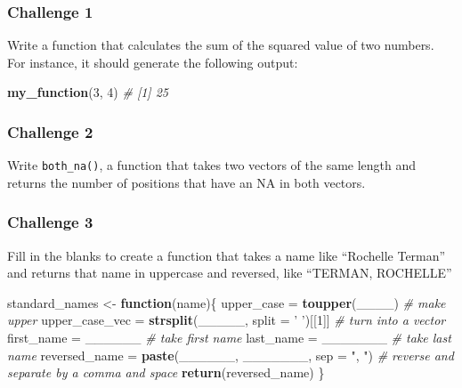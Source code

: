 \documentclass[]{book}
\newenvironment{Shaded}{\begin{snugshade}}{\end{snugshade}}
\newcommand{\CommentTok}[1]{\textcolor[rgb]{0.56,0.35,0.01}{\textit{#1}}}
\newcommand{\ControlFlowTok}[1]{\textcolor[rgb]{0.13,0.29,0.53}{\textbf{#1}}}
\newcommand{\DataTypeTok}[1]{\textcolor[rgb]{0.13,0.29,0.53}{#1}}
\newcommand{\DecValTok}[1]{\textcolor[rgb]{0.00,0.00,0.81}{#1}}
\newcommand{\KeywordTok}[1]{\textcolor[rgb]{0.13,0.29,0.53}{\textbf{#1}}}
\newcommand{\NormalTok}[1]{#1}
\newcommand{\StringTok}[1]{\textcolor[rgb]{0.31,0.60,0.02}{#1}}
\begin{document}
\hypertarget{challenge-1-1}{%
\subsubsection*{Challenge 1}\label{challenge-1-1}}

Write a function that calculates the sum of the squared value of two numbers. For instance, it should generate the following output:

\begin{Shaded}
\begin{Highlighting}[]
\KeywordTok{my_function}\NormalTok{(}\DecValTok{3}\NormalTok{, }\DecValTok{4}\NormalTok{)}
\CommentTok{# [1] 25}
\end{Highlighting}
\end{Shaded}

\hypertarget{challenge-2-1}{%
\subsubsection*{Challenge 2}\label{challenge-2-1}}

Write \texttt{both\_na()}, a function that takes two vectors of the same length and returns the number of positions that have an NA in both vectors.

\hypertarget{challenge-3}{%
\subsubsection*{Challenge 3}\label{challenge-3}}

Fill in the blanks to create a function that takes a name like ``Rochelle Terman'' and returns that name in uppercase and reversed, like ``TERMAN, ROCHELLE''

\begin{Shaded}
\begin{Highlighting}[]
\NormalTok{standard_names <-}\StringTok{ }\ControlFlowTok{function}\NormalTok{(name)\{}
\NormalTok{    upper_case =}\StringTok{ }\KeywordTok{toupper}\NormalTok{(____) }\CommentTok{# make upper}
\NormalTok{    upper_case_vec =}\StringTok{ }\KeywordTok{strsplit}\NormalTok{(_____, }\DataTypeTok{split =} \StringTok{' '}\NormalTok{)[[}\DecValTok{1}\NormalTok{]] }\CommentTok{# turn into a vector}
\NormalTok{    first_name =}\StringTok{ }\NormalTok{______ }\CommentTok{# take first name}
\NormalTok{    last_name =}\StringTok{ }\NormalTok{_______ }\CommentTok{# take last name}
\NormalTok{    reversed_name =}\StringTok{ }\KeywordTok{paste}\NormalTok{(______, _______, }\DataTypeTok{sep =} \StringTok{", "}\NormalTok{) }\CommentTok{# reverse and separate by a comma and space}
    \KeywordTok{return}\NormalTok{(reversed_name)}
\NormalTok{\}}
\end{Highlighting}
\end{Shaded}
\end{document}
